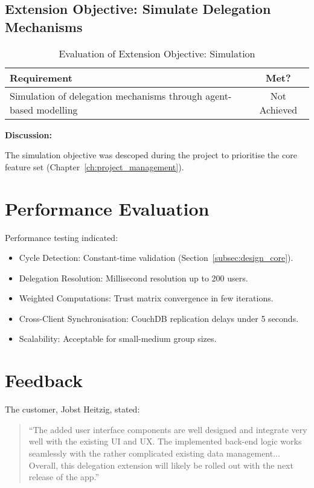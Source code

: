 \subsection{Extension Objective: Simulate Delegation Mechanisms}

\begin{table}[H]
\centering
\begin{tabular}{|p{9cm}|c|}
\hline
\textbf{Requirement} & \textbf{Met?} \\ \hline
Simulation of delegation mechanisms through agent-based modelling & Not Achieved \\ \hline
\end{tabular}
\caption{Evaluation of Extension Objective: Simulation}
\label{tab:objective5_requirements}
\end{table}

\vspace{1em}

\noindent \textbf{Discussion:}

The simulation objective was descoped during the project to prioritise the core feature set (Chapter~\ref{ch:project_management}).

\section{Performance Evaluation}

Performance testing indicated:

\begin{itemize}
    \item Cycle Detection: Constant-time validation (Section~\ref{subsec:design_core}).
    \item Delegation Resolution: Millisecond resolution up to 200 users.
    \item Weighted Computations: Trust matrix convergence in few iterations.
    \item Cross-Client Synchronisation: CouchDB replication delays under 5 seconds.
    \item Scalability: Acceptable for small-medium group sizes.
\end{itemize}

\section{Feedback}

The customer, Jobst Heitzig, stated:

\begin{quote}
``The added user interface components are well designed and integrate very well with the existing UI and UX. The implemented back-end logic works seamlessly with the rather complicated existing data management... Overall, this delegation extension will likely be rolled out with the next release of the app.''
\end{quote}

